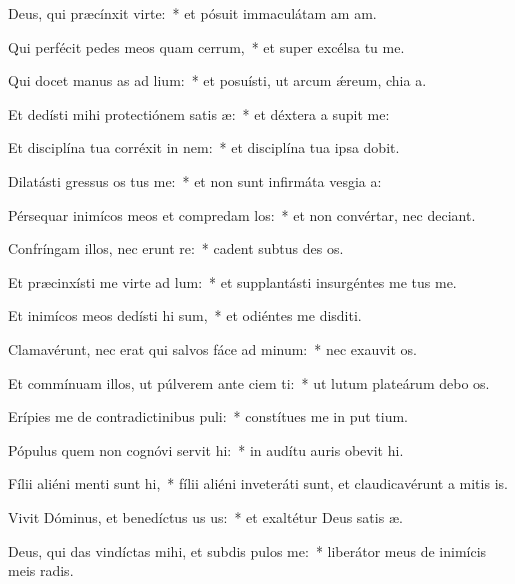 \item Deus, qui præcínxit  virte:~* et pósuit immaculátam am am.
\item Qui perfécit pedes meos quam cerrum,~* et super excélsa tu me.
\item Qui docet manus as ad lium:~* et posuísti, ut arcum ǽreum, chia a.
\item Et dedísti mihi protectiónem satis æ:~* et déxtera a supit me:
\item Et disciplína tua corréxit  in nem:~* et disciplína tua ipsa  dobit.
\item Dilatásti gressus os tus me:~* et non sunt infirmáta vesgia a:
\item Pérsequar inimícos meos et compredam los:~* et non convértar, nec deciant.
\item Confríngam illos, nec erunt re:~* cadent subtus des os.
\item Et præcinxísti me virte ad lum:~* et supplantásti insurgéntes  me tus me.
\item Et inimícos meos dedísti hi sum,~* et odiéntes me disditi.
\item Clamavérunt, nec erat qui salvos fáce ad minum:~* nec exauvit os.
\item Et commínuam illos, ut púlverem ante ciem ti:~* ut lutum plateárum debo os.
\item Erípies me de contradictinibus puli:~* constítues me in put tium.
\item Pópulus quem non cognóvi servit hi:~* in audítu auris obevit hi.
\item Fílii aliéni menti sunt hi,~* fílii aliéni inveteráti sunt, et claudicavérunt a mitis is.
\item Vivit Dóminus, et benedíctus us us:~* et exaltétur Deus satis æ.
\item Deus, qui das vindíctas mihi, et subdis pulos  me:~* liberátor meus de inimícis meis radis.
